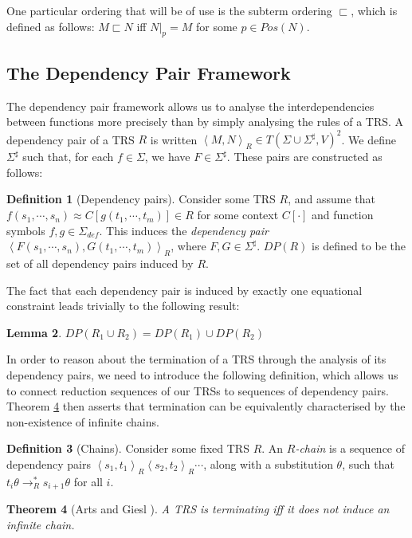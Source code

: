 \documentclass{article}
\newtheorem{theorem}{Theorem}%
\newtheorem{lemma}[theorem]{Lemma}
\theoremstyle{definition}
\newtheorem{definition}[theorem]{Definition}
\newcommand{\dpair}[2]{\left\langle #1, #2 \right\rangle}
\newcommand{\subterm}{\sqsubset}
\begin{document}
One particular ordering that will be of use is the subterm ordering $\subterm$, which is defined as follows: $M \subterm N$ iff $N|_p = M$ for some $p \in Pos(N)$.



\subsection{The Dependency Pair Framework}

The dependency pair framework \cite{arts2000dependency} allows us to analyse the interdependencies between functions more precisely than by simply analysing the rules of a TRS. A dependency pair of a TRS $R$ is written $\dpair{M}{N}_R \in T(\Sigma \cup \Sigma^\sharp, V)^2$. We define $\Sigma^\sharp$ such that, for each $f \in \Sigma$, we have $F \in \Sigma^\sharp$. These pairs are constructed as follows:
\begin{definition}[Dependency pairs]
    Consider some TRS $R$, and assume that $f(s_1, \cdots, s_n) \approx C[g(t_1, \cdots, t_m)] \in R$ for some context $C[\cdot]$ and function symbols $f, g \in \Sigma_{def}$. This induces the \emph{dependency pair} $\dpair{F (s_1, \cdots, s_n)}{G(t_1, \cdots, t_m)}_R $, where $F, G \in \Sigma^\sharp$. $DP(R)$ is defined to be the set of all dependency pairs induced by $R$.
\end{definition}
The fact that each dependency pair is induced by exactly one equational constraint leads trivially to the following result:
\begin{lemma} \label{thm:dep_pair_mod}
    $DP(R_1 \cup R_2) = DP(R_1) \cup DP(R_2)$
\end{lemma}
In order to reason about the termination of a TRS through the analysis of its dependency pairs, we need to introduce the following definition, which allows us to connect reduction sequences of our TRSs to sequences of dependency pairs. Theorem \ref{thm:no_infinite_chains} then asserts that termination can be equivalently characterised by the non-existence of infinite chains.
\begin{definition}[Chains]
    Consider some fixed TRS $R$. An \emph{$R$-chain} is a sequence of dependency pairs $\dpair{s_1}{t_1}_R \dpair{s_2}{t_2}_R \cdots$, along with a substitution $\theta$, such that $t_i \theta \rightarrow_R^* s_{i+1}\theta$ for all $i$.
\end{definition}
\begin{theorem}[Arts and Giesl \cite{arts2000dependency}]\label{thm:no_infinite_chains}
    A TRS is terminating iff it does not induce an infinite chain.
\end{theorem} 
\end{document}
